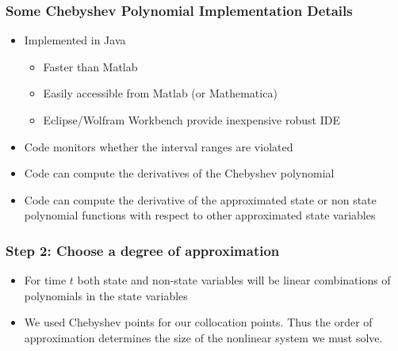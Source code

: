 \documentclass[tikz]{beamer}
\begin{document}
\begin{frame}

\frametitle{Some Chebyshev Polynomial Implementation Details}
\begin{itemize}
\item Implemented in Java
  \begin{itemize}
  \item Faster than Matlab
  \item Easily accessible from Matlab (or Mathematica)
  \item Eclipse/Wolfram Workbench provide inexpensive robust IDE
  \end{itemize}
\item Code monitors whether the interval ranges are violated
\item Code can compute the derivatives of the Chebyshev polynomial
\item Code can compute the derivative of the approximated state or non
  state polynomial functions with respect to other approximated state
  variables 
\end{itemize}



\end{frame}


\begin{frame}

\frametitle{Step 2: Choose a degree of approximation }
\begin{itemize}
\item For time $t$ both state and non-state variables 
will be linear combinations
  of polynomials in the state variables
\item We used Chebyshev points for our collocation points.  Thus the
  order of approximation determines the size of the nonlinear system
  we must solve.
\end{itemize}

\end{frame}
\end{document}
